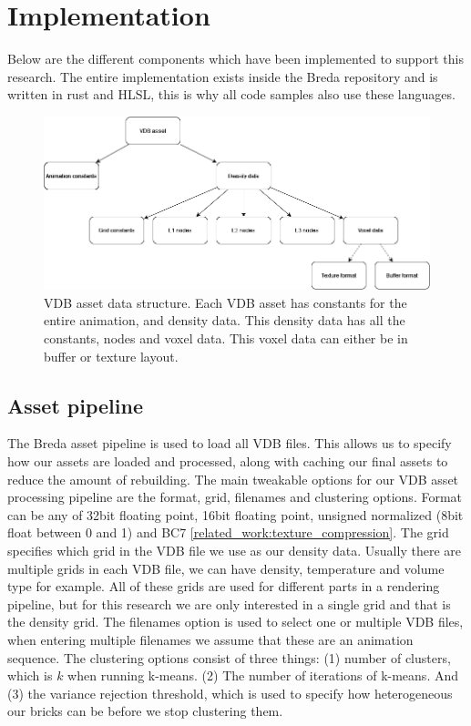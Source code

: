 \section{Implementation} \label{implementation}
Below are the different components which have been implemented to support this research. The entire implementation exists inside the Breda repository and is written in rust and HLSL, this is why all code samples also use these languages.

\begin{figure}
    \centering
    \includegraphics[width=\linewidth]{figures/vdb_asset.png}
    \caption{VDB asset data structure. Each VDB asset has constants for the entire animation, and density data. This density data has all the constants, nodes and voxel data. This voxel data can either be in buffer or texture layout. }
    \label{fig:vdb_asset}
\end{figure}

\subsection{Asset pipeline} \label{implementation:asset_pipeline}
The Breda asset pipeline is used to load all VDB files. This allows us to specify how our assets are loaded and processed, along with caching our final assets to reduce the amount of rebuilding. The main tweakable options for our VDB asset processing pipeline are the format, grid, filenames and clustering options. Format can be any of 32bit floating point, 16bit floating point, unsigned normalized (8bit float between 0 and 1) and BC7 \ref{related_work:texture_compression}. The grid specifies which grid in the VDB file we use as our density data. Usually there are multiple grids in each VDB file, we can have density, temperature and volume type for example. All of these grids are used for different parts in a rendering pipeline, but for this research we are only interested in a single grid and that is the density grid. The filenames option is used to select one or multiple VDB files, when entering multiple filenames we assume that these are an animation sequence. The clustering options consist of three things: (1) number of clusters, which is $k$ when running k-means. (2) The number of iterations of k-means. And (3) the variance rejection threshold, which is used to specify how heterogeneous our bricks can be before we stop clustering them.

